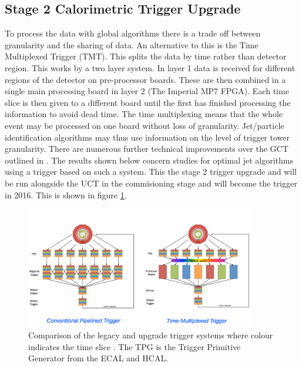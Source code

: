 \subsection{Stage 2 Calorimetric Trigger Upgrade}
To process the data with global algorithms there is a trade off between granularity and the sharing of data. An alternative to this is the Time Multiplexed Trigger (TMT)\cite{rose}. This splits the data by time rather than detector region. This works by a two layer system. In layer 1 data is received for different regions of the detector on pre-processor boards. These are then combined in a single main processing board in layer 2 (The Imperial MP7 FPGA). Each time slice is then given to a different board until the first has finished processing the information to avoid dead time. The time multiplexing means that the whole event may be processed on one board without loss of granularity. Jet/particle identification algorithms may thus use information on the level of trigger tower granularity. There are numerous further technical improvements over the GCT outlined in \cite{rose}. The results shown below concern studies for optimal jet algorithms using a trigger based on such a system. This the stage 2 trigger upgrade and will be run alongside the UCT in the commisioning stage and will become the trigger in 2016. This is shown in figure \ref{tmux}.
\begin{figure}
\centering
    \includegraphics[width=0.9\textwidth]{./Figures/tmux}
  \caption{Comparison of the legacy and upgrade trigger systems where colour indicates the time slice \cite{JBrooke}. The TPG is the Trigger Primitive Generator from the ECAL and HCAL.}
  \label{tmux}
\end{figure}